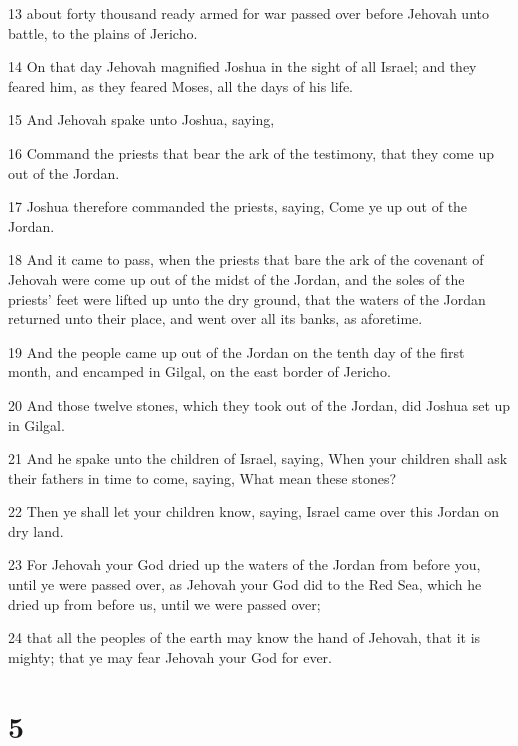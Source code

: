 \par 13 about forty thousand ready armed for war passed over before Jehovah unto battle, to the plains of Jericho.
\par 14 On that day Jehovah magnified Joshua in the sight of all Israel; and they feared him, as they feared Moses, all the days of his life.
\par 15 And Jehovah spake unto Joshua, saying,
\par 16 Command the priests that bear the ark of the testimony, that they come up out of the Jordan.
\par 17 Joshua therefore commanded the priests, saying, Come ye up out of the Jordan.
\par 18 And it came to pass, when the priests that bare the ark of the covenant of Jehovah were come up out of the midst of the Jordan, and the soles of the priests' feet were lifted up unto the dry ground, that the waters of the Jordan returned unto their place, and went over all its banks, as aforetime.
\par 19 And the people came up out of the Jordan on the tenth day of the first month, and encamped in Gilgal, on the east border of Jericho.
\par 20 And those twelve stones, which they took out of the Jordan, did Joshua set up in Gilgal.
\par 21 And he spake unto the children of Israel, saying, When your children shall ask their fathers in time to come, saying, What mean these stones?
\par 22 Then ye shall let your children know, saying, Israel came over this Jordan on dry land.
\par 23 For Jehovah your God dried up the waters of the Jordan from before you, until ye were passed over, as Jehovah your God did to the Red Sea, which he dried up from before us, until we were passed over;
\par 24 that all the peoples of the earth may know the hand of Jehovah, that it is mighty; that ye may fear Jehovah your God for ever.

\chapter{5}

